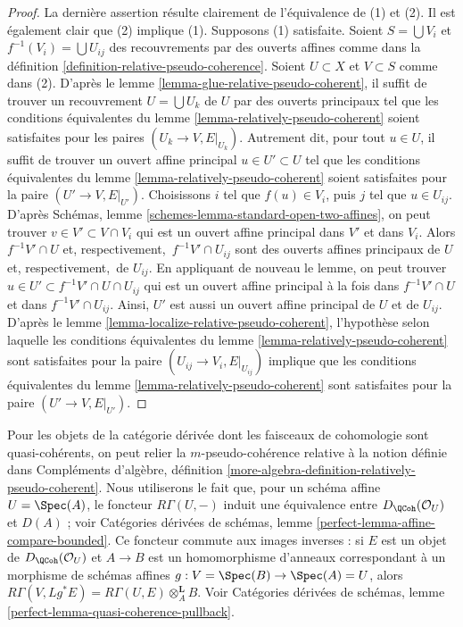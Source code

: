 \begin{proof}
La dernière assertion résulte clairement de l'équivalence de (1) et (2).
Il est également clair que (2) implique (1). Supposons (1) satisfaite.
Soient $S = \bigcup V_i$ et $f^{-1}(V_i) = \bigcup U_{ij}$ des
recouvrements par des ouverts affines comme dans la
définition \ref{definition-relative-pseudo-coherence}.
Soient $U \subset X$ et $V \subset S$ comme dans (2).
D'après le lemme \ref{lemma-glue-relative-pseudo-coherent},
il suffit de trouver un recouvrement $U = \bigcup U_k$ de $U$ par des ouverts principaux
tel que les conditions équivalentes du
lemme \ref{lemma-relatively-pseudo-coherent}
soient satisfaites pour les paires $(U_k \to V, E|_{U_k})$.
Autrement dit, pour tout $u \in U$, il suffit
de trouver un ouvert affine principal $u \in U' \subset U$ tel que
les conditions équivalentes du
lemme \ref{lemma-relatively-pseudo-coherent}
soient satisfaites pour la paire $(U' \to V, E|_{U'})$.
Choisissons $i$ tel que $f(u) \in V_i$, puis $j$ tel que
$u \in U_{ij}$. D'après
Schémas, lemme \ref{schemes-lemma-standard-open-two-affines},
on peut trouver $v \in V' \subset V \cap V_i$ qui est un ouvert affine principal
dans $V'$ et dans $V_i$. Alors $f^{-1}V'  \cap U$ et, respectivement,\ $f^{-1}V' \cap U_{ij}$
sont des ouverts affines principaux de $U$ et, respectivement,\ de $U_{ij}$.
En appliquant de nouveau le lemme, on peut trouver
$u \in U' \subset f^{-1}V' \cap U \cap U_{ij}$ qui est un ouvert affine principal
à la fois dans $f^{-1}V'  \cap U$ et dans $f^{-1}V' \cap U_{ij}$.
Ainsi, $U'$ est aussi un ouvert affine principal de $U$ et de $U_{ij}$.
D'après le lemme \ref{lemma-localize-relative-pseudo-coherent},
l'hypothèse selon laquelle les conditions équivalentes du
lemme \ref{lemma-relatively-pseudo-coherent}
sont satisfaites pour la paire $(U_{ij} \to V_i, E|_{U_{ij}})$
implique que les conditions équivalentes du
lemme \ref{lemma-relatively-pseudo-coherent}
sont satisfaites pour la paire $(U' \to V, E|_{U'})$.
\end{proof}

\noindent
Pour les objets de la catégorie dérivée dont les faisceaux de cohomologie sont
quasi-cohérents, on peut relier la $m$-pseudo-cohérence relative
à la notion définie dans Compléments d'algèbre, définition
\ref{more-algebra-definition-relatively-pseudo-coherent}.
Nous utiliserons le fait que, pour un schéma affine
$U = \Spec(A)$, le foncteur $R\Gamma(U, -)$ induit une équivalence
entre $D_\QCoh(\mathcal{O}_U)$ et $D(A)$ ; voir
Catégories dérivées de schémas, lemme
\ref{perfect-lemma-affine-compare-bounded}.
Ce foncteur commute aux images inverses :
si $E$ est un objet de $D_\QCoh(\mathcal{O}_U)$
et $A \to B$ est un homomorphisme d'anneaux correspondant à un morphisme de
schémas affines $g : V = \Spec(B) \to \Spec(A) = U$, alors
$R\Gamma(V, Lg^*E) = R\Gamma(U, E) \otimes_A^\mathbf{L} B$.
Voir Catégories dérivées de schémas, lemme
\ref{perfect-lemma-quasi-coherence-pullback}.

